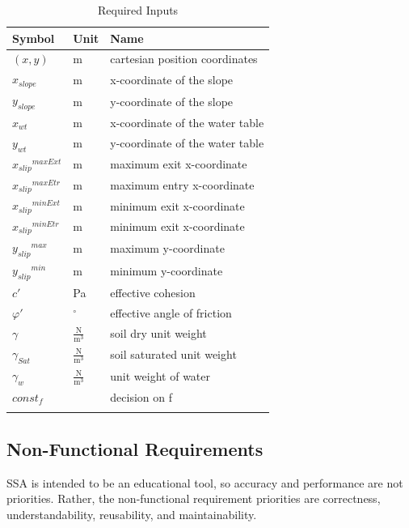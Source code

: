\documentclass[12pt]{article}
\begin{document}
\begin{longtable}{l l l}
\toprule
Symbol & Unit & Name
\\
\midrule
\endhead
$(x,y)$ & m & cartesian position coordinates
\\
${x_{slope}}$ & m & x-coordinate of the slope
\\
${y_{slope}}$ & m & y-coordinate of the slope
\\
${x_{wt}}$ & m & x-coordinate of the water table
\\
${y_{wt}}$ & m & y-coordinate of the water table
\\
${{x_{slip}}^{maxExt}}$ & m & maximum exit x-coordinate
\\
${{x_{slip}}^{maxEtr}}$ & m & maximum entry x-coordinate
\\
${{x_{slip}}^{minExt}}$ & m & minimum exit x-coordinate
\\
${{x_{slip}}^{minEtr}}$ & m & minimum exit x-coordinate
\\
${{y_{slip}}^{max}}$ & m & maximum y-coordinate
\\
${{y_{slip}}^{min}}$ & m & minimum y-coordinate
\\
$c'$ & Pa & effective cohesion
\\
$φ'$ & ${}^{\circ}$ & effective angle of friction
\\
$γ$ & $\frac{\text{N}}{\text{m}^{3}}$ & soil dry unit weight
\\
${γ_{Sat}}$ & $\frac{\text{N}}{\text{m}^{3}}$ & soil saturated unit weight
\\
${γ_{w}}$ & $\frac{\text{N}}{\text{m}^{3}}$ & unit weight of water
\\
$const_f$ &  & decision on f
\\
\bottomrule
\caption{Required Inputs}
\label{Table:inDataTable}
\end{longtable}
\subsection{Non-Functional Requirements}
\label{Sec:NFRs}
SSA is intended to be an educational tool, so accuracy and performance are not priorities.  Rather, the non-functional requirement priorities are correctness, understandability, reusability, and maintainability.
\end{document}
